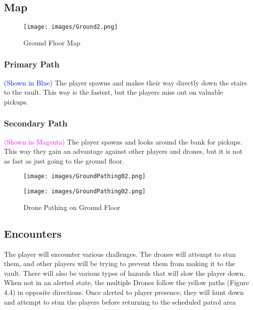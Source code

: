 \documentclass[10pt]{report}
\begin{document}
\subsection{Map}

\begin{figure}[H]
    \centering
    \texttt{[image: images/Ground2.png]}
    \caption{Ground Floor Map}
\end{figure}

\subsubsection{Primary Path}

\textcolor{blue}{(Shown in Blue)} The player spawns and makes their way directly down the stairs to the vault. This way is the fastest, but the players miss out on valuable pickups.

\subsubsection{Secondary Path}

\textcolor{magenta}{(Shown in Magenta)} The player spawns and looks around the bank for pickups. This way they gain an advantage against other players and drones, but it is not as fast as just going to the ground floor.

\begin{figure}[H]
    \centering
    \texttt{[image: images/GroundPathing02.png]}
    \caption{}
\end{figure}

\begin{figure}[H]
    \centering
    \texttt{[image: images/GroundPathing02.png]}
    \caption{Drone Pathing on Ground Floor}
\end{figure}

\subsection{Encounters}

The player will encounter various challenges. The drones will attempt to stun them, and other players will be trying to prevent them from making it to the vault. There will also be various types of hazards that will slow the player down. When not in an alerted state, the multiple Drones follow the yellow paths (Figure 4.4) in opposite directions. Once alerted to player presence, they will hunt down and attempt to stun the players before returning to the scheduled patrol area
\end{document}
